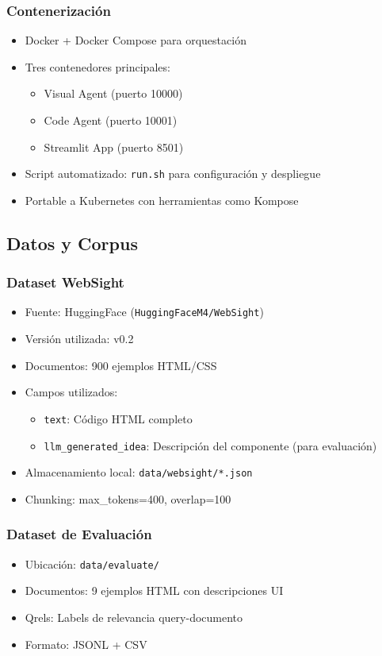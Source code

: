 \documentclass[12pt,a4paper]{article}
\begin{document}
\subsubsection{Contenerización}
\begin{itemize}
    \item Docker + Docker Compose para orquestación
    \item Tres contenedores principales:
    \begin{itemize}
        \item Visual Agent (puerto 10000)
        \item Code Agent (puerto 10001)
        \item Streamlit App (puerto 8501)
    \end{itemize}
    \item Script automatizado: \texttt{run.sh} para configuración y despliegue
    \item Portable a Kubernetes con herramientas como Kompose
\end{itemize}

\subsection{Datos y Corpus}

\subsubsection{Dataset WebSight}
\begin{itemize}
    \item Fuente: HuggingFace (\texttt{HuggingFaceM4/WebSight})
    \item Versión utilizada: v0.2
    \item Documentos: 900 ejemplos HTML/CSS
    \item Campos utilizados:
    \begin{itemize}
        \item \texttt{text}: Código HTML completo
        \item \texttt{llm\_generated\_idea}: Descripción del componente (para evaluación)
    \end{itemize}
    \item Almacenamiento local: \texttt{data/websight/*.json}
    \item Chunking: max\_tokens=400, overlap=100
\end{itemize}

\subsubsection{Dataset de Evaluación}
\begin{itemize}
    \item Ubicación: \texttt{data/evaluate/}
    \item Documentos: 9 ejemplos HTML con descripciones UI
    \item Qrels: Labels de relevancia query-documento
    \item Formato: JSONL + CSV
\end{itemize}
\end{document}
